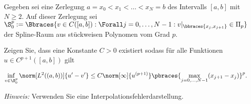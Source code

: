 
\begin{exercise}

Gegeben sei eine Zerlegung $a = x_0 < x_1 < \dots < x_N = b$ des Intervalls $[a, b]$ mit $N \geq 2$.
Auf dieser Zerlegung sei $\S_0^p := \Bbraces{v \in C([a, b]): \Forall j = 0, \dots, N-1 : v|_{\bbraces{x_j, x_{j+1}}} \in \Pi_p}$ der Spline-Raum aus stückweisen Polynomen vom Grad $p$.

Zeigen Sie, dass eine Konstante $C > 0$ existiert sodass für alle Funktionen $u \in C^{p+1}([a, b])$ gilt

\begin{align}
  \inf_{v \in \S^p_0}
  \norm[L^2((a, b))]{u^\prime - v^\prime}
  \leq
  C \norm[\infty]{u^{(p+1)}}
  \pbraces
  {
    \max_{j=0, \dots, N-1}
    (x_{j+1} - x_j)
  }^p.
\end{align}

\textit{Hinweis:}
Verwenden Sie eine Interpolationsfehlerdarstellung.

\end{exercise}


